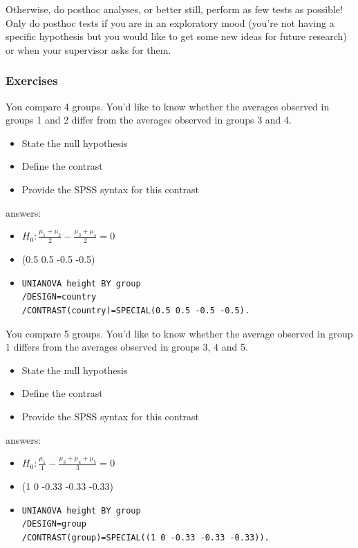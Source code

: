 \documentclass[]{report}\usepackage[]{graphicx}\usepackage[]{color}
\begin{document}
Otherwise, do posthoc analyses, or better still, perform as few tests as possible! Only do posthoc tests if you are in an exploratory mood (you're not having a specific hypothesis but you would like to get some new ideas for future research) or when your supervisor asks for them.





\subsubsection{Exercises}

You compare 4 groups. You'd like to know whether the averages observed in groups 1 and 2 differ from the averages observed in groups 3 and 4. 

\begin{itemize}
\item State the null hypothesis
\item Define the contrast
\item Provide the SPSS syntax for this contrast
\end{itemize}

answers: 
\begin{itemize}
\item $H_0: \frac{\mu_1 + \mu_2}{2} - \frac{\mu_3 + \mu_4}{2} = 0  $
\item (0.5 0.5 -0.5 -0.5)
\item \begin{verbatim}
UNIANOVA height BY group
/DESIGN=country
/CONTRAST(country)=SPECIAL(0.5 0.5 -0.5 -0.5).
\end{verbatim}
\end{itemize}




You compare 5 groups. You'd like to know whether the average observed in group 1 differs from the averages observed in groups 3, 4 and 5. 

\begin{itemize}
\item State the null hypothesis
\item Define the contrast
\item Provide the SPSS syntax for this contrast
\end{itemize}

answers: 
\begin{itemize}
\item $H_0: \frac{\mu_1}{1} - \frac{\mu_3 + \mu_4 + \mu_5}{3} = 0  $
\item (1 0 -0.33 -0.33 -0.33)
\item \begin{verbatim}
UNIANOVA height BY group
/DESIGN=group
/CONTRAST(group)=SPECIAL((1 0 -0.33 -0.33 -0.33)).
\end{verbatim}
\end{itemize}
\end{document}
